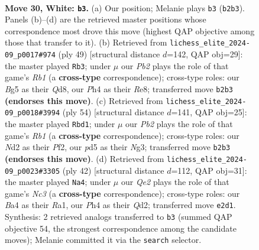 \documentclass[11pt]{article}
\begin{document}
\clearpage

\begin{figure}[p]\centering
\begin{subfigure}{0.46\textwidth}\centering
\resizebox{\linewidth}{!}{%
\newchessgame
\chessboard[
  setfen={r1b2r2/pp3pbk/n2qpnp1/P2p2Bp/B2P3P/6P1/RPPNQP2/1N2R1K1 w - - 13 30},
  showmover=false,
  pgfstyle=straightmove, color=movearrow, markmove={b2-b3}
]}
\caption{}
\end{subfigure}\hfill
\begin{subfigure}{0.46\textwidth}\centering
\resizebox{\linewidth}{!}{%
\newchessgame
\chessboard[
  setfen={1r1qrb1k/5pp1/4b2p/n2pPpNN/p1pP3P/P1P1B1P1/4QPK1/R6R b - - 6 25},
  showmover=false,
  pgfstyle=straightmove, color=movearrow, markmove={b8-b3}
]}
\caption{}
\end{subfigure}
\\[4pt]
\begin{subfigure}{0.46\textwidth}\centering
\resizebox{\linewidth}{!}{%
\newchessgame
\chessboard[
  setfen={2br1r2/1pp3qk/p1pb1pp1/P6p/1PQNPn1P/4B1N1/2P2PP1/1R2R1K1 w - - 1 28},
  showmover=false,
  pgfstyle=straightmove, color=movearrow, markmove={b1-d1}
]}
\caption{}
\end{subfigure}\hfill
\begin{subfigure}{0.46\textwidth}\centering
\resizebox{\linewidth}{!}{%
\newchessgame
\chessboard[
  setfen={r3r1k1/1pq3bp/p2p2p1/Pb1Pnp2/1PpB4/2N3P1/3QPPBP/R1R3K1 w - - 0 22},
  showmover=false,
  pgfstyle=straightmove, color=movearrow, markmove={c3-a4}
]}
\caption{}
\end{subfigure}
\caption{\textbf{Move 30, White: \texttt{b3}.} (a) Our position; Melanie plays \texttt{b3} (\texttt{b2b3}). Panels (b)--(d) are the retrieved master positions whose correspondence most drove this move (highest QAP objective among those that transfer to it). (b) Retrieved from \texttt{lichess\_elite\_2024-09\_p0017\#974} (ply 49) [structural distance $d$=142, QAP obj=29]: the master played \texttt{Rb3}; under $\mu$ our \emph{Pb2} plays the role of that game's \emph{Rb1} (a \textbf{cross-type} correspondence); cross-type roles: our \emph{B}g5 as their \emph{Q}d8, our \emph{P}h4 as their \emph{R}e8; transferred move \texttt{b2b3} \textbf{(endorses this move)}. (c) Retrieved from \texttt{lichess\_elite\_2024-09\_p0018\#3994} (ply 54) [structural distance $d$=141, QAP obj=25]: the master played \texttt{Rbd1}; under $\mu$ our \emph{Pb2} plays the role of that game's \emph{Rb1} (a \textbf{cross-type} correspondence); cross-type roles: our \emph{N}d2 as their \emph{P}f2, our \emph{p}d5 as their \emph{N}g3; transferred move \texttt{b2b3} \textbf{(endorses this move)}. (d) Retrieved from \texttt{lichess\_elite\_2024-09\_p0023\#3305} (ply 42) [structural distance $d$=112, QAP obj=31]: the master played \texttt{Na4}; under $\mu$ our \emph{Qe2} plays the role of that game's \emph{Nc3} (a \textbf{cross-type} correspondence); cross-type roles: our \emph{B}a4 as their \emph{R}a1, our \emph{P}h4 as their \emph{Q}d2; transferred move \texttt{e2d1}. Synthesis: 2 retrieved analogs transferred to \texttt{b3} (summed QAP objective 54, the strongest correspondence among the candidate moves); Melanie committed it via the \texttt{search} selector.}

\end{figure}
\end{document}
